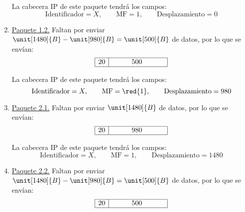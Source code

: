 \begin{ejemplo}
\begin{enumerate}
        La cabecera IP de este paquete tendrá los campos:
        \begin{equation*}
            \text{Identificador} = X,\qquad \text{MF} = 1,\qquad \text{Desplazamiento} = 0
        \end{equation*}

        \item \ul{Paquete 1.2.} Faltan por enviar $\unit[1480]{B}-\unit[980]{B}=\unit[500]{B}$ de datos, por lo que se envían:
        \begin{equation*}
            \begin{array}{|c|c|}
                \hline 20 & \hspace{1cm} 500 \hspace{1cm}~\\ \hline
            \end{array}
        \end{equation*}

        La cabecera IP de este paquete tendrá los campos:
        \begin{equation*}
            \text{Identificador} = X,\qquad \text{MF} = \red{1},\qquad \text{Desplazamiento} = 980
        \end{equation*}

        \item \ul{Paquete 2.1.} Faltan por enviar $\unit[1480]{B}$ de datos, por lo que se envían:
        \begin{equation*}
            \begin{array}{|c|c|}
                \hline 20 & \hspace{1cm} 980 \hspace{1cm}~\\ \hline
            \end{array}
        \end{equation*}

        La cabecera IP de este paquete tendrá los campos:
        \begin{equation*}
            \text{Identificador} = X,\qquad \text{MF} = 1,\qquad \text{Desplazamiento} = 1480
        \end{equation*}

        \item \ul{Paquete 2.2.} Faltan por enviar $\unit[1480]{B}-\unit[980]{B}=\unit[500]{B}$ de datos, por lo que se envían:
        \begin{equation*}
            \begin{array}{|c|c|}
                \hline 20 & \hspace{1cm} 500 \hspace{1cm}~\\ \hline
            \end{array}
        \end{equation*}


\end{enumerate}
\end{ejemplo}
